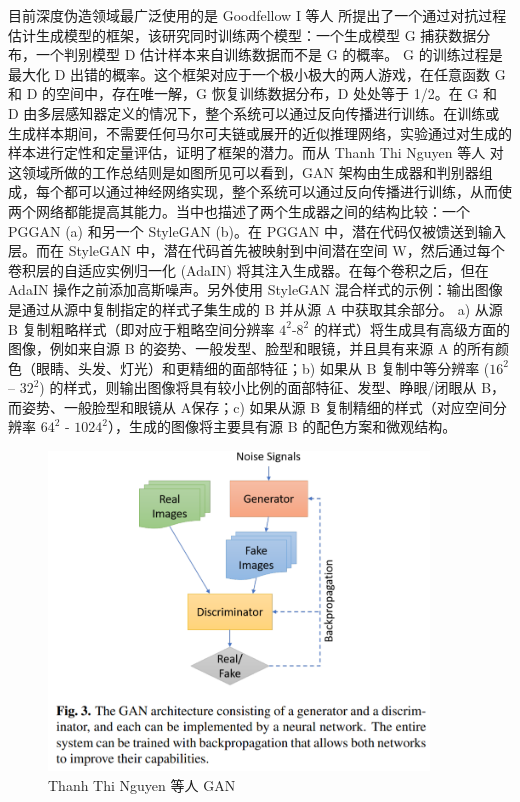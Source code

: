 目前深度伪造领域最广泛使用的是 Goodfellow I 等人 \cite{goodfellow2014generative} 所提出了一个通过对抗过程估计生成模型的框架，该研究同时训练两个模型：一个生成模型 G 捕获数据分布，一个判别模型 D 估计样本来自训练数据而不是 G 的概率。 G 的训练过程是最大化 D 出错的概率。这个框架对应于一个极小极大的两人游戏，在任意函数 G 和 D 的空间中，存在唯一解，G 恢复训练数据分布，D 处处等于 1/2。在 G 和 D 由多层感知器定义的情况下，整个系统可以通过反向传播进行训练。在训练或生成样本期间，不需要任何马尔可夫链或展开的近似推理网络，实验通过对生成的样本进行定性和定量评估，证明了框架的潜力。而从 Thanh Thi Nguyen 等人 \cite{https://doi.org/10.48550/arxiv.1909.11573} 对这领域所做的工作总结则是如图所见可以看到，GAN 架构由生成器和判别器组成，每个都可以通过神经网络实现，整个系统可以通过反向传播进行训练，从而使两个网络都能提高其能力。当中也描述了两个生成器之间的结构比较：一个 PGGAN (a) 和另一个 StyleGAN (b)。在 PGGAN 中，潜在代码仅被馈送到输入层。而在 StyleGAN 中，潜在代码首先被映射到中间潜在空间 W，然后通过每个卷积层的自适应实例归一化 (AdaIN) 将其注入生成器。在每个卷积之后，但在 AdaIN 操作之前添加高斯噪声。另外使用 StyleGAN 混合样式的示例：输出图像是通过从源中复制指定的样式子集生成的
B 并从源 A 中获取其余部分。 a) 从源 B 复制粗略样式（即对应于粗略空间分辨率 $4^2$-$8^2$ 的样式）将生成具有高级方面的图像，例如来自源 B 的姿势、一般发型、脸型和眼镜，并且具有来源 A 的所有颜色（眼睛、头发、灯光）和更精细的面部特征；b) 如果从 B 复制中等分辨率 ($16^2$ – $32^2$) 的样式，则输出图像将具有较小比例的面部特征、发型、睁眼/闭眼从 B，而姿势、一般脸型和眼镜从 A保存；c) 如果从源 B 复制精细的样式（对应空间分辨率 $64^2$ - $1024^2$），生成的图像将主要具有源 B 的配色方案和微观结构。

\begin{figure}[htb]
\centering 
\includegraphics[width=0.90\textwidth]{img/ch3m9.png} 
\caption{ Thanh Thi Nguyen 等人 \cite{https://doi.org/10.48550/arxiv.1909.11573} GAN}
\label{Test}
\end{figure}

